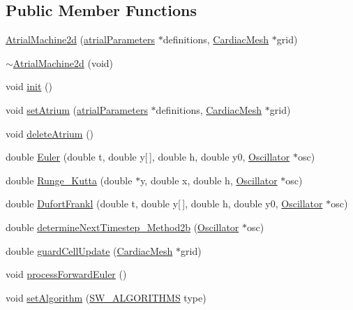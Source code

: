 \subsection*{Public Member Functions}
\begin{DoxyCompactItemize}
\item 
\hyperlink{class_atrial_machine2d_a1181b8a58b70e0374cfaefcbf2c29b12}{Atrial\+Machine2d} (\hyperlink{classatrial_parameters}{atrial\+Parameters} $\ast$definitions, \hyperlink{class_cardiac_mesh}{Cardiac\+Mesh} $\ast$grid)
\item 
\hyperlink{class_atrial_machine2d_a955b6614307d86c8d9e196a3b7ce2434}{$\sim$\+Atrial\+Machine2d} (void)
\item 
void \hyperlink{class_atrial_machine2d_a22a0e5a3d07859721cce24ed253932ed}{init} ()
\item 
void \hyperlink{class_atrial_machine2d_a80f97d261da5f2ca116592b07455425a}{set\+Atrium} (\hyperlink{classatrial_parameters}{atrial\+Parameters} $\ast$definitions, \hyperlink{class_cardiac_mesh}{Cardiac\+Mesh} $\ast$grid)
\item 
void \hyperlink{class_atrial_machine2d_a40366613671e5856d0c3cd0572398dc1}{delete\+Atrium} ()
\item 
double \hyperlink{class_atrial_machine2d_a9cd5c318f2021169ee6a28ca27ff6924}{Euler} (double t, double y\mbox{[}$\,$\mbox{]}, double h, double y0, \hyperlink{class_oscillator}{Oscillator} $\ast$osc)
\item 
double \hyperlink{class_atrial_machine2d_a2d181080d4da8598ce58dc29d3ee707a}{Runge\+\_\+\+Kutta} (double $\ast$y, double x, double h, \hyperlink{class_oscillator}{Oscillator} $\ast$osc)
\item 
double \hyperlink{class_atrial_machine2d_af35ca9286dbe3f236b31ddd84f9d25e4}{Dufort\+Frankl} (double t, double y\mbox{[}$\,$\mbox{]}, double h, double y0, \hyperlink{class_oscillator}{Oscillator} $\ast$osc)
\item 
double \hyperlink{class_atrial_machine2d_afb0f7ee5a1efa0f20b1f3c145927374a}{determine\+Next\+Timestep\+\_\+\+Method2b} (\hyperlink{class_oscillator}{Oscillator} $\ast$osc)
\item 
double \hyperlink{class_atrial_machine2d_ad0cfe6a11b68c40c8db51da0a4ccb4cb}{guard\+Cell\+Update} (\hyperlink{class_cardiac_mesh}{Cardiac\+Mesh} $\ast$grid)
\item 
void \hyperlink{class_atrial_machine2d_aac348bf7321fae9fe7d8265f36e9d1e6}{process\+Forward\+Euler} ()
\item 
void \hyperlink{class_atrial_machine2d_aab1d925f08bbf319b374f6d2b879878b}{set\+Algorithm} (\hyperlink{heart_defines_8h_ae0e356ca8deebb30aca0cd91e0cbd46c}{S\+W\+\_\+\+A\+L\+G\+O\+R\+I\+T\+H\+M\+S} type)
\end{DoxyCompactItemize}
